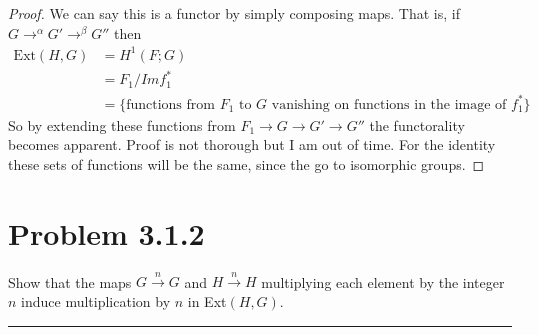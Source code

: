 \documentclass{article}
\theoremstyle{definition}
\begin{document}
    \begin{proof}

            We can say this is a functor by simply composing maps.
            That is, if $G \to^\alpha G' \to^\beta G''$ then 
            \begin{align*}
                \text{Ext}(H,G) &= H^1(F;G) \\
                &= F_1 / Im f_1^* \\
                &= \{\text{functions from $F_1$ to $G$ vanishing on functions 
                in the image of $f_1^*$}\}
            \end{align*}
            So by extending these functions from $F_1 \to G \to G' \to G''$ the 
            functorality becomes apparent. Proof is not thorough but I am out of time.
            For the identity these sets of functions will be the same, since the go 
            to isomorphic groups.
    \end{proof}
\section*{Problem 3.1.2}
Show that the maps $G \xrightarrow{n}G$ and $H\xrightarrow{n}H$ multiplying
each element by the integer $n$ induce multiplication by $n$ in Ext$(H,G)$.
\\
\par\noindent\rule{\textwidth}{0.4pt}
\end{document}
